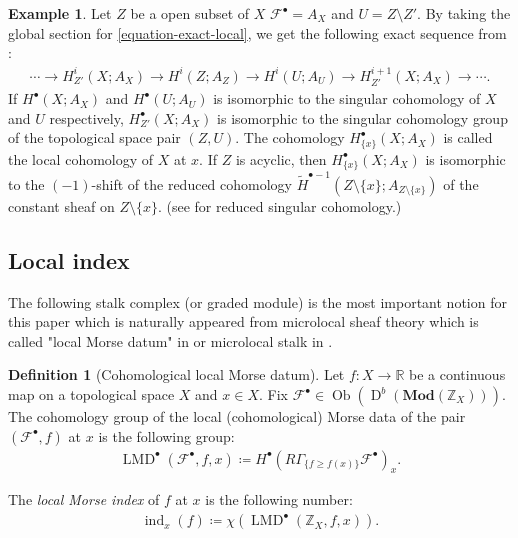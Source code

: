 \documentclass[a4paper,dvipdfmx,reqno,12pt]{amsart}
\theoremstyle{definition}
\newtheorem{definition}[theorem]{Definition}
\newtheorem{example}[theorem]{Example}
\newcommand{\deq}{\coloneqq}
\newcommand{\mcal}[1]{\mathcal{#1}}%
\newcommand{\opn}[1]{\operatorname{#1}}
\newcommand{\catn}[1]{\mathbf{#1}}
\numberwithin{equation}{section}
\begin{document}
\begin{example}
\label{example-local-cohomology}
Let $Z$ be a open subset of $X$ 
$\mathcal{F}^{\bullet}=A_{X}$ 
and $U=Z\setminus Z'$.
By taking the global 
section for \cref{equation-exact-local}, we get 
the following exact sequence from 
\cite[Proposition 2.3.9 (iv)]{MR1299726}:
\begin{align}
  \cdots \to H^{i}_{Z'}(X;A_X)\to
H^{i}(Z;A_{Z})\to H^{i}(U;A_U)\to 
H^{i+1}_{Z'}(X;A_X) \to \cdots.
\end{align}
If $H^{\bullet}(X;A_X)$ and $H^{\bullet}(U;A_U)$ 
is isomorphic to the singular cohomology of $X$ and $U$
respectively, $H^{\bullet}_{Z'}(X;A_X)$ is isomorphic to
the singular cohomology group of the topological space 
pair $(Z,U)$.
The cohomology $H^{\bullet}_{\{x\}}(X;A_X)$ is called
the local cohomology of $X$ at $x$.
If $Z$ is acyclic, then $H^{\bullet}_{\{x\}}(X;A_X)$ is 
isomorphic to the $(-1)$-shift of the reduced cohomology 
$\tilde{H}^{\bullet-1}(Z\setminus \{x\};
A_{Z\setminus \{x\}})$
of the constant sheaf on $Z\setminus \{x\}$.
(see 
\cite[p.199]{hatcherAlgebraicTopology2002a} for 
reduced singular cohomology.)
\end{example}

\subsection{Local index}

The following stalk complex (or graded module) is 
the most important notion
for this paper which is naturally appeared from 
microlocal sheaf theory 
which is called "local Morse datum" in \cite[p.271]{MR2031639} 
or microlocal stalk in \cite{MR4132582}.
\begin{definition}[{Cohomological local Morse datum}]
\label{definition-local-morse-data}
Let $f\colon X\to {\mathbb{R}}$ be a continuous map on a 
topological space $X$ and $x\in X$. Fix 
$\mathcal{F}^{\bullet}\in 
\opn{Ob}(\opn{D}^{b}(\catn{Mod}(\mathbb{Z}_X)))$.
The cohomology group of the local (cohomological) Morse 
data of the pair $(\mathcal{F}^{\bullet},f)$ at $x$ 
is the following group: 
\begin{align}
\opn{LMD}^{\bullet}(\mcal{F}^{\bullet},f,x)\deq 
H^{\bullet}(R\Gamma_{\{f\geq f(x)\}}\mathcal{F}^{\bullet})_x.
\end{align}

The \emph{local Morse index} of $f$ at $x$ is the 
following number:
\begin{align} \label{equation-local-index}
\opn{ind}_x(f)\deq \chi(\opn{LMD}^{\bullet}(\mathbb{Z}_X,f,x)).
\end{align}

\end{definition}
\end{document}
